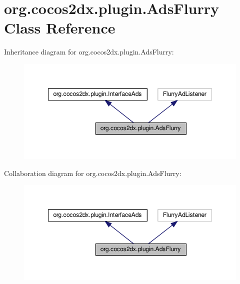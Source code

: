 \hypertarget{classorg_1_1cocos2dx_1_1plugin_1_1AdsFlurry}{}\section{org.\+cocos2dx.\+plugin.\+Ads\+Flurry Class Reference}
\label{classorg_1_1cocos2dx_1_1plugin_1_1AdsFlurry}


Inheritance diagram for org.\+cocos2dx.\+plugin.\+Ads\+Flurry\+:
\nopagebreak
\begin{figure}[H]
\begin{center}
\leavevmode
\includegraphics[width=348pt]{classorg_1_1cocos2dx_1_1plugin_1_1AdsFlurry__inherit__graph}
\end{center}
\end{figure}


Collaboration diagram for org.\+cocos2dx.\+plugin.\+Ads\+Flurry\+:
\nopagebreak
\begin{figure}[H]
\begin{center}
\leavevmode
\includegraphics[width=348pt]{classorg_1_1cocos2dx_1_1plugin_1_1AdsFlurry__coll__graph}
\end{center}
\end{figure}
